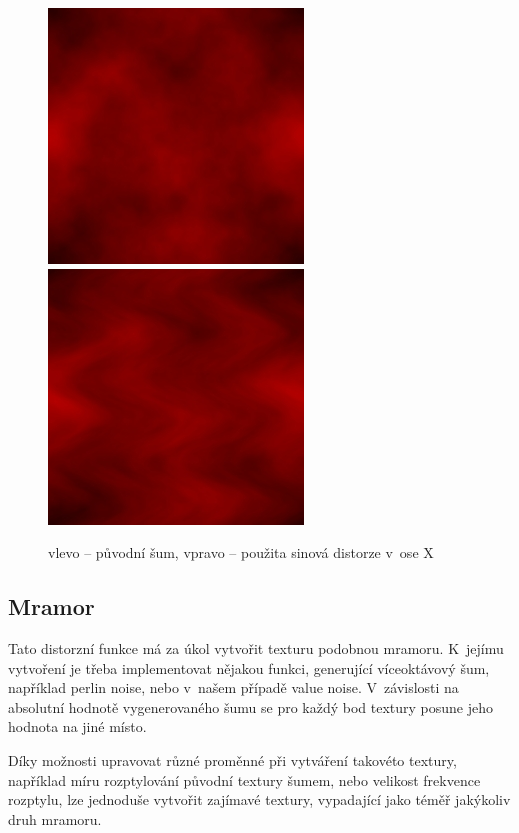 \begin{figure}[h]
    \begin{center}
      \includegraphics[scale=0.65]{fig/noSinDistort}
      \includegraphics[scale=0.65]{fig/SinDistort} 
      \caption{vlevo -- původní šum, vpravo -- použita sinová distorze v~ose X} 
      \label{SinDistortFIG}
    \end{center}
\end{figure}

\subsection{Mramor}
Tato distorzní funkce má za úkol vytvořit texturu podobnou mramoru. 
K~jejímu vytvoření je třeba implementovat nějakou funkci, generující víceoktávový šum, například perlin noise, nebo v~našem případě value noise.
V~závislosti na absolutní hodnotě vygenerovaného šumu se pro každý bod textury posune jeho hodnota na jiné místo.

Díky možnosti upravovat různé proměnné při vytváření takovéto textury, například míru rozptylování původní textury šumem, nebo velikost frekvence rozptylu, lze jednoduše vytvořit zajímavé textury, vypadající jako téměř jakýkoliv druh mramoru.

